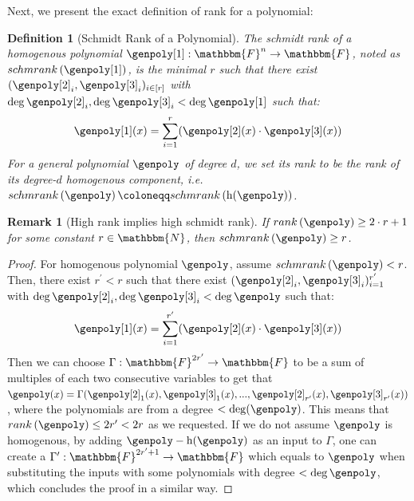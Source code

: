 \documentclass[10pt,a4paper]{article}
\newtheorem{definition}[theorem]{Definition}
\newtheorem{remark}[theorem]{Remark}
\newcommand{\definedas}[0]{\coloneqq}
\newcommand{\parens}[1]{\left( #1 \right)}
\newcommand{\basefield}[0]{\mathbbm{F}}
\newcommand{\blocklength}[0]{n}
\newcommand{\field}[0]{\basefield^{\blocklength}}
\newcommand{\degree}[0]{d}
\newcommand{\funcdef}[3]{#1:#2\rightarrow#3}
\newcommand{\naturalnumbersset}[0]{\mathbbm{N}}
\newcommand{\homopart}[1]{\mathrm{h}({#1})}
\newcommand{\rank}[1]{rank \parens{#1}}
\newcommand{\schmrank}[1]{schmrank \parens{#1}}
\begin{document}
Next, we present the exact definition of rank for a polynomial:
\begin{definition}[Schmidt Rank of a Polynomial]
    The schmidt rank of a homogenous polynomial $\funcdef{\genpoly[1]}{\field}{\basefield}$, noted as $\schmrank{\genpoly[1]}$, is the minimal $r$ such that there exist $(\genpoly[2]_i, \genpoly[3]_i)_{i\in[r]}$
    with $\deg{\genpoly[2]_i}, \deg{\genpoly[3]_i} < \deg{\genpoly[1]}$ such that:
    \[
        \genpoly[1](x) = \sum_{i=1}^{r}(\genpoly[2](x) \cdot \genpoly[3](x))
    \]
    For a general polynomial $\genpoly$ of degree $\degree$, we set its rank to be the rank of its degree-$\degree$ homogenous component, i.e. $\schmrank{\genpoly} \definedas \schmrank{\homopart{\genpoly}}$.
\end{definition}

\begin{remark}[High rank implies high schmidt rank]\label{high-rank-implies-high-schmidt-rank}
If $\rank{\genpoly} \geq 2 \cdot r + 1$ for some constant $r \in \naturalnumbersset$, then $\schmrank{\genpoly} \geq r$.
\end{remark}
\begin{proof}
    For homogenous polynomial $\genpoly$, assume $\schmrank{\genpoly} < r$.
    Then, there exist $r^\prime < r$ such that there exist $(\genpoly[2]_i, \genpoly[3]_i)_{i=1}^{r^\prime}$ with $\deg{\genpoly[2]_i}, \deg{\genpoly[3]}_i < \deg \genpoly$ such that:
    \[
        \genpoly[1](x) = \sum_{i=1}^{r^\prime}(\genpoly[2](x) \cdot \genpoly[3](x))
    \]
    Then we can choose $\funcdef{\Gamma}{\basefield^{2r^\prime}}{\basefield}$ to be a sum of multiples of each two consecutive variables to get that
    $\genpoly(x) = \Gamma(\genpoly[2]_1(x), \genpoly[3]_1(x),...,\genpoly[2]_{r^\prime}(x), \genpoly[3]_{r^\prime}(x))$, where the polynomials are from a degree $< \deg(\genpoly)$.
    This means that $\rank{\genpoly} \leq 2r^{\prime} < 2r$ as we requested.
    \newline
    If we do not assume $\genpoly$ is homogenous, by adding $\genpoly - \homopart{\genpoly}$ as an input to $\Gamma$,
    one can create a $\funcdef{\Gamma^\prime}{\basefield^{2r^\prime+1}}{\basefield}$
    which equals to $\genpoly$ when substituting the inputs with some polynomials with degree $< \deg{\genpoly}$,
    which concludes the proof in a similar way.
\end{proof}
\end{document}

